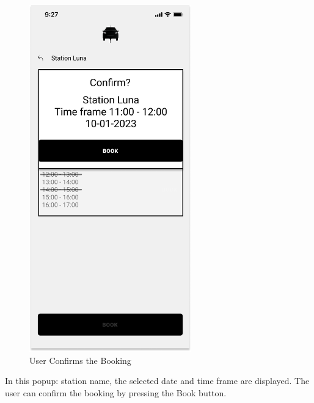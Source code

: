 \begin{figure}[H]
    \centering
    \includegraphics[keepaspectratio, height=15cm]{AppInterface/Book Confirmation.png}
    \caption{User Confirms the Booking}
    \label{pop:Booking}
\end{figure}
In this popup: station name, the selected date and time frame are displayed. The user can confirm the booking by pressing the Book button.
